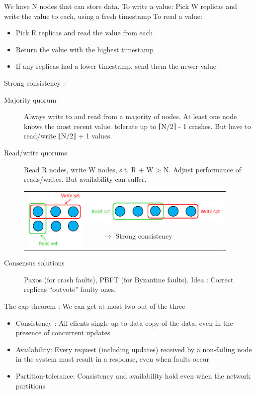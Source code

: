 We have N nodes that can store data.
To write a value: Pick W replicas and write the value to each, using a fresh timestamp
To read a value:
\begin{itemize}
    \item Pick R replicas and read the value from each
    \item Return the value with the highest timestamp
    \item If any replicas had a lower timestamp, send them the newer value
\end{itemize}

Strong consistency :
\begin{description}
    \item[Majority quorum] Always write to and read from a majority of nodes. At least one node knows the most recent value. tolerate up to ⌈N/2⌉ - 1 crashes. But have to read/write ⌊N/2⌋ + 1 values.
    \item[Read/write quorums] Read R nodes, write W nodes, s.t. R + W > N. Adjust performance of reads/writes. But availability can suffer.

        \begin{tabular}{m{5cm}m{12cm}}
            \includegraphics[width=3cm]{img/replicas} &
            \includegraphics[width=7cm]{img/replicas2}
            \begin{itemize}
                \item[$\rightarrow$] Strong consistency
            \end{itemize} \\
        \end{tabular}
    \item[Consensus solutions] Paxos (for crash faults), PBFT (for Byzantine faults). Idea : Correct replicas ``outvote'' faulty ones.
\end{description}

The cap theorem : We can get at most two out of the three
\begin{itemize}
    \item Consistency : All clients single up-to-data copy of the data, even in the presence of concurrent updates
    \item Availability: Every request (including updates) received by a non-failing node in the system must result in a response, even when faults occur
    \item Partition-tolerance: Consistency and availability hold even when the network partitions
\end{itemize}

